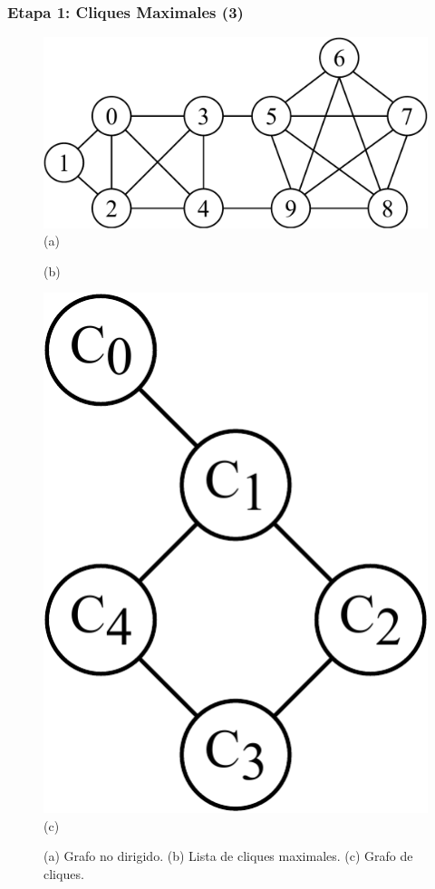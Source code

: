 \begin{frame}
\frametitle{Etapa 1: Cliques Maximales (3)}

\begin{figure}
    	\centering
    	\begin{minipage}{0.45\textwidth}
    		\centering
    		\includegraphics[width=1\linewidth,clip=true]{../img/graphs-Graph2.pdf}
    		(a)
    	\end{minipage}
    	\begin{minipage}{0.25\textwidth}
    		\centering
    		
    		(b)
    	\end{minipage}
    	\begin{minipage}{0.15\textwidth}
    		\centering
    		\includegraphics[width=1\linewidth,clip=true]{../img/graphs-Cliques2.pdf}
    		(c)
    	\end{minipage}
    \caption{(a) Grafo no dirigido. (b) Lista de cliques maximales. (c) Grafo de cliques.}
    \label{fig:gafoEj}
\end{figure}

\end{frame}
